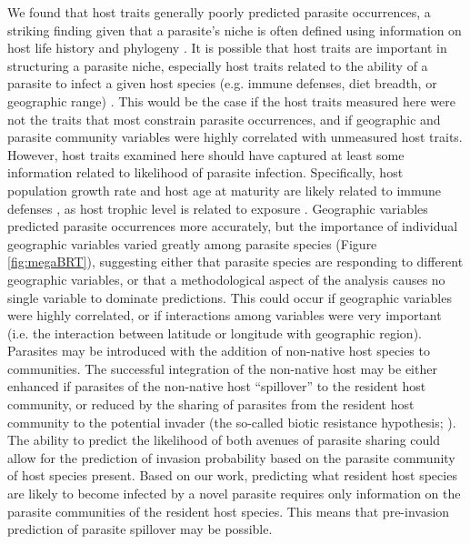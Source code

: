 \documentclass[12pt]{article}
\begin{document}
  
 We found that host traits generally poorly predicted parasite occurrences, a striking finding given that a parasite's niche is often defined using information on host life history and phylogeny \citep{strona2012, rohde1993}. It is possible that host traits are important in structuring a parasite niche, especially host traits related to the ability of a parasite to infect a given host species (e.g. immune defenses, diet breadth, or geographic range) \citep{johnson2012}. This would be the case if the host traits measured here were not the traits that most constrain parasite occurrences, and if geographic and parasite community variables were highly correlated with unmeasured host traits. However, host traits examined here should have captured at least some information related to likelihood of parasite infection. Specifically, host population growth rate and host age at maturity are likely related to immune defenses \citep{zuk2002}, as host trophic level is related to exposure \citep{price1990}. Geographic variables predicted parasite occurrences more accurately, but the importance of individual geographic variables varied greatly among parasite species (Figure \ref{fig:megaBRT}), suggesting either that parasite species are responding to different geographic variables, or that a methodological aspect of the analysis causes no single variable to dominate predictions. This could occur if geographic variables were highly correlated, or if interactions among variables were very important (i.e. the interaction between latitude or longitude with geographic region). \\
 
   
 Parasites may be introduced with the addition of non-native host species to communities. The successful integration of the non-native host may be either enhanced if parasites of the non-native host ``spillover'' to the resident host community, or reduced by the sharing of parasites from the resident host community to the potential invader (the so-called biotic resistance hypothesis; \citet{britton2013}). The ability to predict the likelihood of both avenues of parasite sharing could allow for the prediction of invasion probability based on the parasite community of host species present. Based on our work, predicting what resident host species are likely to become infected by a novel parasite requires only information on the parasite communities of the resident host species. This means that pre-invasion prediction of parasite spillover may be possible.  
 
  
  
\end{document}
